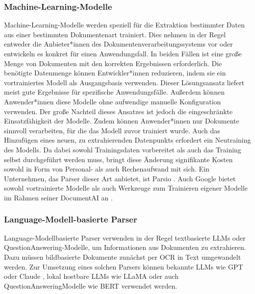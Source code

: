 \subsubsection{Machine-Learning-Modelle}
\label{subsubsec:vortrainierte-Modelle}

Machine-Learning-Modelle werden speziell für die Extraktion bestimmter Daten aus einer bestimmten Dokumentenart trainiert. Dies nehmen in der Regel entweder die Anbieter*innen des Dokumentenverarbeitungssystems vor oder entwickeln es konkret für einen Anwendungsfall. In beiden Fällen ist eine große Menge von Dokumenten mit den korrekten Ergebnissen erforderlich. Die benötigte Datenmenge können Entwickler*innen reduzieren, indem sie ein vortrainiertes Modell als Ausgangsbasis verwenden. Dieser Lösungsansatz liefert meist gute Ergebnisse für spezifische Anwendungsfälle. Außerdem können Anwender*innen diese Modelle ohne aufwendige manuelle Konfiguration verwenden. Der große Nachteil dieses Ansatzes ist jedoch die eingeschränkte Einsatzfähigkeit der Modelle. Zudem können Anwender*innen nur Dokumente sinnvoll verarbeiten, für die das Modell zuvor trainiert wurde. Auch das Hinzufügen eines neuen, zu extrahierenden Datenpunkts erfordert ein Neutraining des Modells. Da dabei sowohl Trainingsdaten vorbereitet als auch das Training selbst durchgeführt werden muss, bringt diese Änderung signifikante Kosten sowohl in Form von Personal- als auch Rechenaufwand mit sich. Ein Unternehmen, das Parser dieser Art anbietet, ist Parsio \parencite{parsio_pdf_extraction}. Auch Google bietet sowohl vortrainierte Modelle als auch Werkzeuge zum Trainieren eigener Modelle im Rahmen seiner DocumentAI an \parencite{google_documentAI}.

\subsubsection{Language-Modell-basierte Parser}
\label{subsubsec:llm-basierte-modelle}

Language-Modell\-basierte Parser verwenden in der Regel textbasierte \glspl{LLM} oder Question\-Answering-Modelle, um Informationen aus Dokumenten zu extrahieren. Dazu müssen bildbasierte Dokumente zunächst per \gls{OCR} in Text umgewandelt werden. Zur Umsetzung eines solchen Parsers können bekannte \glspl{LLM} wie GPT \parencite{BrownTomB2020LMaF, openai_chatgpt} oder Claude \parencite{anthropic_claude}, lokal hostbare \glspl{LLM} wie LLaMA \parencite{TouvronHugo2023LOaE} oder auch Question\-Answering\-Modelle wie BERT \parencite{DevlinJacob2019BPoD} verwendet werden.

